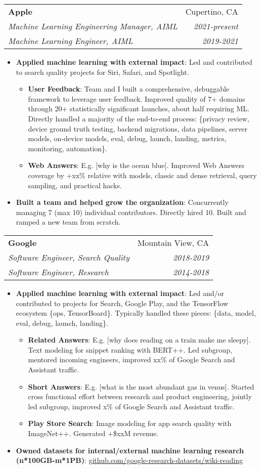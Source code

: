 \documentclass[letterpaper,9pt]{article}
\makeatletter
\newcommand{\resumeItem}[2]{
  \item\small{
    \textbf{#1}{: #2 \vspace{-2pt}}
  }
}
\newcommand{\resumeDoubleSubheading}[6]{
  \vspace{-1pt}\item
    \begin{tabular*}{0.97\textwidth}[t]{l@{\extracolsep{\fill}}r}
      \textbf{#1} & #2 \\
      \textit{\small#3} & \textit{\small #4} \\
      \textit{\small#5} & \textit{\small #6} \\
    \end{tabular*}\vspace{-5pt}
}
\newcommand{\resumeItemListStart}{\begin{itemize}}
\newcommand{\resumeItemListEnd}{\end{itemize}\vspace{-5pt}}
\makeatother
\begin{document}
    \resumeDoubleSubheading
      {Apple}{Cupertino, CA}
      {Machine Learning Engineering Manager, AIML}{2021-present}
      {Machine Learning Engineer, AIML}{2019-2021}
      \resumeItemListStart
        \resumeItem{Applied machine learning with external impact}
          {
              \newline Led and contributed to search quality projects for Siri, Safari, and Spotlight.
          }
          \resumeItemListStart
            \resumeItem{User Feedback}
            {Team and I built a comprehensive, debuggable framework to leverage user feedback.
                \newline Improved quality of 7+ domains through 20+ statistically significant launches, about half requiring ML.
                \newline Directly handled a majority of the end-to-end process: \{privacy review, device ground truth testing, backend migrations, data pipelines, server models, on-device models, eval, debug, launch, landing, metrics, monitoring, automation\}.
            }
            \vspace{4pt}
            \resumeItem{Web Answers}{E.g. [why is the ocean blue]. Improved Web Answers coverage by +xx\% relative with models, classic and dense retrieval, query sampling, and practical hacks.}
          \resumeItemListEnd
          \vspace{4pt}
        \resumeItem{Built a team and helped grow the organization}
          {Concurrently managing 7 (max 10) individual contributors. Directly hired 10. Built and ramped a new team from scratch.}
      \resumeItemListEnd
      
    \resumeDoubleSubheading
      {Google}{Mountain View, CA}
      {Software Engineer, Search Quality}{2018-2019}
      {Software Engineer, Research}{2014-2018}
      \resumeItemListStart
        \resumeItem{Applied machine learning with external impact}
          {
              \newline Led and/or contributed to projects for Search, Google Play, and the TensorFlow ecosystem \{ops, TensorBoard\}.
              \newline Typically handled these pieces: \{data, model, eval, debug, launch, landing\}.
          }
          \resumeItemListStart
            \resumeItem{Related Answers}{E.g. [why does reading on a train make me sleepy]. Text modeling for snippet ranking with BERT++. Led subgroup, mentored incoming engineers, improved xx\% of Google Search and Assistant traffic.}
            \resumeItem{Short Answers}{E.g. [what is the most abundant gas in venus]. Started cross functional effort between research and product engineering, jointly led subgroup, improved x\% of Google Search and Assistant traffic.}
            \resumeItem{Play Store Search}{Image modeling for app search quality with ImageNet++. Generated +\$xxM revenue.}
          \resumeItemListEnd
          \vspace{4pt}
        \resumeItem{Owned datasets for internal/external machine learning research (n*100GB-m*1PB)}
          {\href{https://github.com/google-research-datasets/wiki-reading}{github.com/google-research-datasets/wiki-reading}}
      \resumeItemListEnd
\end{document}
